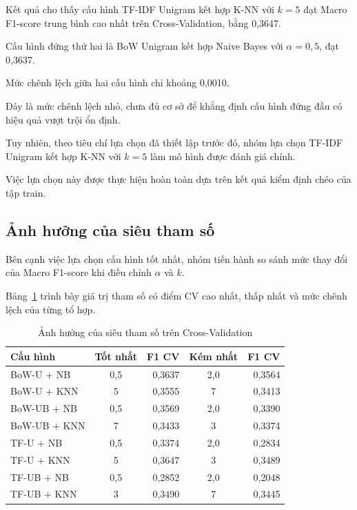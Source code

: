 Kết quả cho thấy cấu hình TF-IDF Unigram kết hợp
K-NN với $k=5$ đạt Macro F1-score trung bình cao
nhất trên Cross-Validation, bằng 0,3647.

Cấu hình đứng thứ hai là BoW Unigram kết hợp
Naive Bayes với $\alpha=0,5$, đạt 0,3637.

Mức chênh lệch giữa hai cấu hình chỉ khoảng 0,0010.

Đây là mức chênh lệch nhỏ, chưa đủ cơ sở để khẳng
định cấu hình đứng đầu có hiệu quả vượt trội ổn định.

Tuy nhiên, theo tiêu chí lựa chọn đã thiết lập
trước đó, nhóm lựa chọn TF-IDF Unigram kết hợp
K-NN với $k=5$ làm mô hình được đánh giá chính.

Việc lựa chọn này được thực hiện hoàn toàn dựa
trên kết quả kiểm định chéo của tập train.

\subsection{Ảnh hưởng của siêu tham số}

Bên cạnh việc lựa chọn cấu hình tốt nhất,
nhóm tiến hành so sánh mức thay đổi của Macro
F1-score khi điều chỉnh $\alpha$ và $k$.

Bảng~\ref{tab:ch4-anh-huong-tham-so} trình bày
giá trị tham số có điểm CV cao nhất, thấp nhất
và mức chênh lệch của từng tổ hợp.

\begin{table}[H]
\centering
\caption{Ảnh hưởng của siêu tham số trên Cross-Validation}
\label{tab:ch4-anh-huong-tham-so}
\renewcommand{\arraystretch}{1.12}
\small

\begin{tabularx}{\textwidth}{|X|c|r|c|r|}
\hline
\textbf{Cấu hình}
& \textbf{Tốt nhất}
& \textbf{F1 CV}
& \textbf{Kém nhất}
& \textbf{F1 CV} \\
\hline

BoW-U + NB
& 0,5 & 0,3637
& 2,0 & 0,3564 \\
\hline

BoW-U + KNN
& 5 & 0,3555
& 7 & 0,3413 \\
\hline

BoW-UB + NB
& 0,5 & 0,3569
& 2,0 & 0,3390 \\
\hline

BoW-UB + KNN
& 7 & 0,3433
& 3 & 0,3374 \\
\hline

TF-U + NB
& 0,5 & 0,3374
& 2,0 & 0,2834 \\
\hline

TF-U + KNN
& 5 & 0,3647
& 3 & 0,3489 \\
\hline

TF-UB + NB
& 0,5 & 0,2852
& 2,0 & 0,2048 \\
\hline

TF-UB + KNN
& 3 & 0,3490
& 7 & 0,3445 \\
\hline

\end{tabularx}
\end{table}


